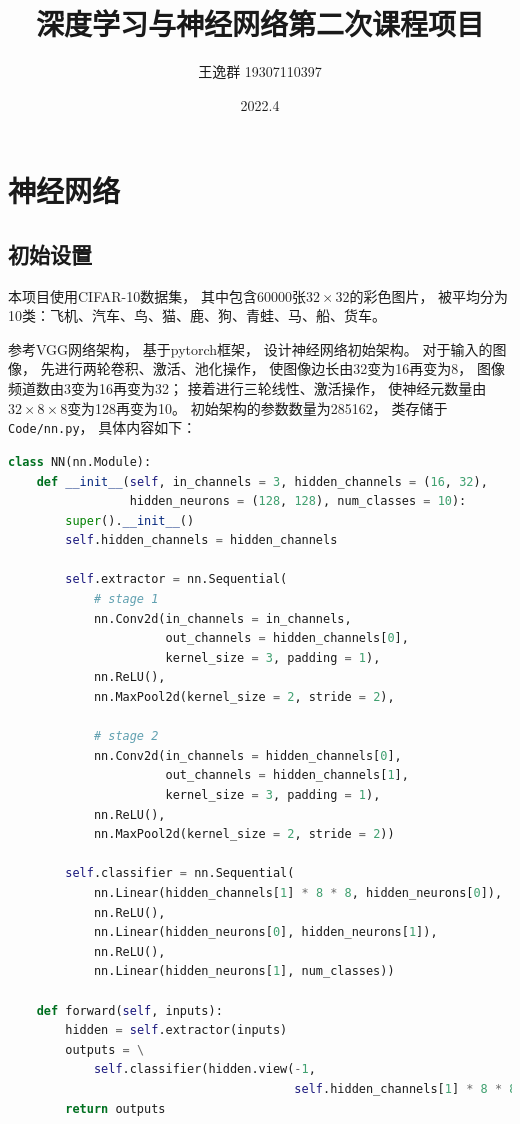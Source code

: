 \documentclass{article}
\title{深度学习与神经网络第二次课程项目}
\author{王逸群 19307110397}
\date{2022.4}
\begin{document}
	
\maketitle
\tableofcontents

\section{神经网络}

\subsection{初始设置}

本项目使用CIFAR-10数据集，
其中包含60000张$32\times32$的彩色图片，
被平均分为10类：飞机、汽车、鸟、猫、鹿、狗、青蛙、马、船、货车。

参考VGG网络架构，
基于pytorch框架，
设计神经网络初始架构。
对于输入的图像，
先进行两轮卷积、激活、池化操作，
使图像边长由32变为16再变为8，
图像频道数由3变为16再变为32；
接着进行三轮线性、激活操作，
使神经元数量由$32\times8\times8$变为128再变为10。
初始架构的参数数量为285162，
类存储于\verb|Code/nn.py|，
具体内容如下：

\begin{lstlisting}[language=Python]
class NN(nn.Module):
    def __init__(self, in_channels = 3, hidden_channels = (16, 32), 
                 hidden_neurons = (128, 128), num_classes = 10):
        super().__init__()
        self.hidden_channels = hidden_channels

        self.extractor = nn.Sequential(
            # stage 1
            nn.Conv2d(in_channels = in_channels,
                      out_channels = hidden_channels[0],
                      kernel_size = 3, padding = 1),
            nn.ReLU(),
            nn.MaxPool2d(kernel_size = 2, stride = 2),

            # stage 2
            nn.Conv2d(in_channels = hidden_channels[0],
                      out_channels = hidden_channels[1],
                      kernel_size = 3, padding = 1),
            nn.ReLU(),
            nn.MaxPool2d(kernel_size = 2, stride = 2))

        self.classifier = nn.Sequential(
            nn.Linear(hidden_channels[1] * 8 * 8, hidden_neurons[0]),
            nn.ReLU(),
            nn.Linear(hidden_neurons[0], hidden_neurons[1]),
            nn.ReLU(),
            nn.Linear(hidden_neurons[1], num_classes))

    def forward(self, inputs):
        hidden = self.extractor(inputs)
        outputs = \
            self.classifier(hidden.view(-1,
                                        self.hidden_channels[1] * 8 * 8))
        return outputs
\end{lstlisting}
\end{document}
